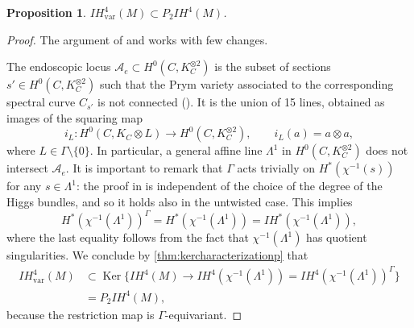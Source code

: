 \documentclass[JEP,XML,SOM,Unicode, NoEqCountersInSection,NoFloatCountersInSection,published]{cedram}
\let\mathcal\mathscr
\let\ra\rightarrow
\newcommand{\IH}{\mathit{IH}}
\DeclareMathOperator{\Ker}{Ker}
\newtheorem{prop}[thm]{Proposition}
\theoremstyle{definition}
\begin{document}
\begin{prop}\label{prop:perv4var}
$\IH_{\mathrm{var}}^4(M) \subset P_2 \IH^4(M)$.
\end{prop}
\begin{proof}
The argument of \cite[\S 4.4]{deCataldoHauselMigliorini2012} and \cite[Prop.\,1.4]{deCataldoMaulikShen2020} works with few changes.

The endoscopic locus $\mathcal{A}_e \subset H^0(C, K_C^{\otimes 2})$ is the subset of sections $s' \in H^0(C, K_C^{\otimes 2})$ such that the Prym variety associated to the corresponding spectral curve $C_{s'}$ is not connected (\cf \cite[\S 4.4]{deCataldoHauselMigliorini2012}). It is the union of 15 lines, obtained as images of the squaring map\vspace*{-3pt}
\[
i_L\colon H^0(C, K_C \otimes L) \to H^0(C, K_C^{\otimes 2}), \qquad i_L(a)=a \otimes a,
\]
where $L \in \Gamma \setminus \{0\}$. In particular, a general affine line $\Lambda^1$ in $H^0(C, K_C^{\otimes 2})$ does not intersect $\mathcal{A}_e$. It is important to remark that $\Gamma$ acts trivially on $H^*(\chi^{-1}(s))$ for any $s \in \Lambda^1$: the proof in \cite[\S 4.4]{deCataldoHauselMigliorini2012} is independent of the choice of the degree of the Higgs bundles, and so it holds also in the untwisted case.
This implies\vspace*{-3pt}
\[
H^*(\chi^{-1}(\Lambda^1))^{\Gamma} = H^*(\chi^{-1}(\Lambda^1))= \IH^*(\chi^{-1}(\Lambda^1)),
\]
where the last equality follows from the fact that $\chi^{-1}(\Lambda^1)$ has quotient singularities.
We conclude by \cref{thm:kercharacterizationp} that\vspace*{-3pt}
\begin{align*}
\IH_{\mathrm{var}}^4(M) & \subset \Ker \{\IH^4(M) \ra \IH^4(\chi^{-1}(\Lambda^1))= \IH^4(\chi^{-1}(\Lambda^1))^{\Gamma}\}\\
& = P_2 \IH^4(M),
\end{align*}
because the restriction map is $\Gamma$-equivariant.
\end{proof}
\end{document}
